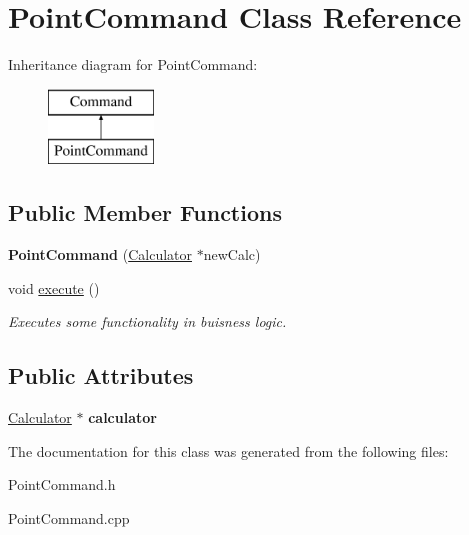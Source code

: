 \hypertarget{class_point_command}{}\section{Point\+Command Class Reference}
\label{class_point_command}
Inheritance diagram for Point\+Command\+:\begin{figure}[H]
\begin{center}
\leavevmode
\includegraphics[height=2.000000cm]{class_point_command}
\end{center}
\end{figure}
\subsection*{Public Member Functions}
\begin{DoxyCompactItemize}
\item 
\hypertarget{class_point_command_acc022d8812e9d289bf723dd900a338bb}{}{\bfseries Point\+Command} (\hyperlink{class_calculator}{Calculator} $\ast$new\+Calc)\label{class_point_command_acc022d8812e9d289bf723dd900a338bb}

\item 
\hypertarget{class_point_command_a681f8465afa18959cd268fab140d9f69}{}void \hyperlink{class_point_command_a681f8465afa18959cd268fab140d9f69}{execute} ()\label{class_point_command_a681f8465afa18959cd268fab140d9f69}

\begin{DoxyCompactList}\small\item\em Executes some functionality in buisness logic. \end{DoxyCompactList}\end{DoxyCompactItemize}
\subsection*{Public Attributes}
\begin{DoxyCompactItemize}
\item 
\hypertarget{class_point_command_a63132439ae2e59216eddddd4754f9109}{}\hyperlink{class_calculator}{Calculator} $\ast$ {\bfseries calculator}\label{class_point_command_a63132439ae2e59216eddddd4754f9109}

\end{DoxyCompactItemize}


The documentation for this class was generated from the following files\+:\begin{DoxyCompactItemize}
\item 
Point\+Command.\+h\item 
Point\+Command.\+cpp\end{DoxyCompactItemize}
